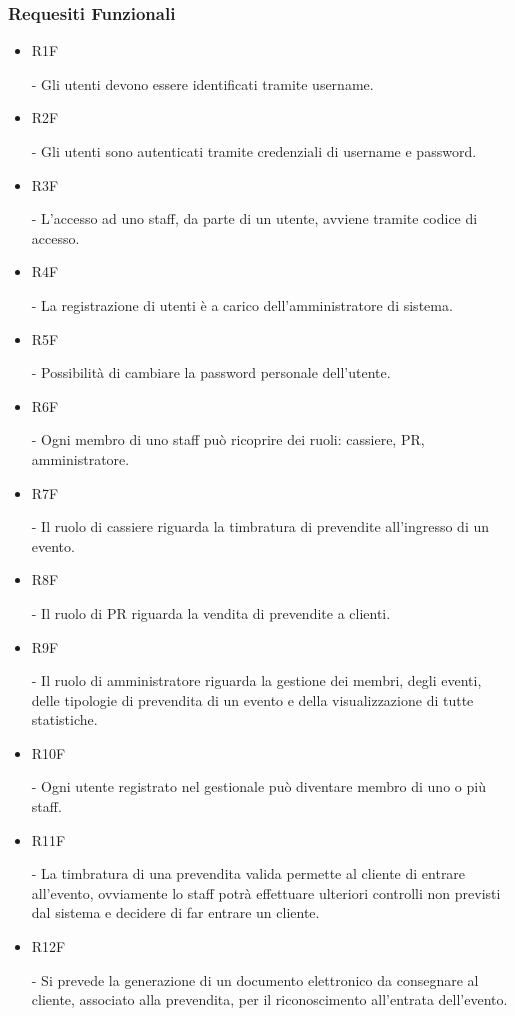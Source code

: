 \documentclass[a4paper]{article}
\begin{document}
\subsubsection{Requesiti Funzionali}

\begin{itemize}
	
	\item \hypertarget{R1F}{R1F} - Gli utenti devono essere identificati tramite username.
	
	\item \hypertarget{R2F}{R2F} - Gli utenti sono autenticati tramite credenziali di username e password.
	\item \hypertarget{R3F}{R3F} - L'accesso ad uno staff, da parte di un utente, avviene tramite codice di accesso.	

	\item \hypertarget{R4F}{R4F} - La registrazione di utenti è a carico dell'amministratore di sistema.
	\item \hypertarget{R5F}{R5F} - Possibilità di cambiare la password personale dell'utente.
		
	\item \hypertarget{R6F}{R6F} - Ogni membro di uno staff può ricoprire dei ruoli: cassiere, PR, amministratore.	
	\item \hypertarget{R7F}{R7F} - Il ruolo di cassiere riguarda la timbratura di prevendite all'ingresso di un evento.
	\item \hypertarget{R8F}{R8F} - Il ruolo di PR riguarda la vendita di prevendite a clienti.
	\item \hypertarget{R9F}{R9F} - Il ruolo di amministratore riguarda la gestione dei membri, degli eventi, delle tipologie di prevendita di un evento e della visualizzazione di tutte statistiche.
	
	\item \hypertarget{R10F}{R10F} - Ogni utente registrato nel gestionale può diventare membro di uno o più staff. 
	
	\item \hypertarget{R11F}{R11F} - La timbratura di una prevendita valida permette al cliente di entrare all'evento, ovviamente lo staff potrà effettuare ulteriori controlli non previsti dal sistema e decidere di far entrare un cliente.
	
	\item \hypertarget{R12F}{R12F} - Si prevede la generazione di un documento elettronico da consegnare al cliente, associato alla prevendita, per il riconoscimento all'entrata dell'evento.
	

\end{itemize}
\end{document}
